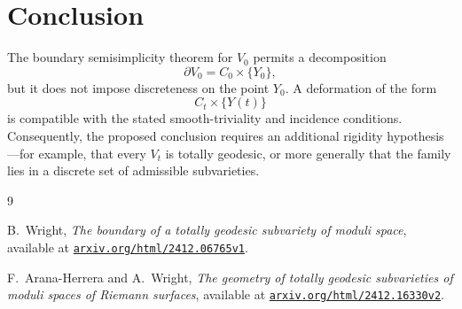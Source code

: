 \documentclass[11pt]{article}
\begin{document}
\section{Conclusion}

The boundary semisimplicity theorem for \(V_0\) permits a decomposition
\[
\partial V_0=C_0\times\{Y_0\},
\]
but it does not impose discreteness on the point \(Y_0\).  A deformation of
the form
\[
C_t\times\{Y(t)\}
\]
is compatible with the stated smooth-triviality and incidence conditions.
Consequently, the proposed conclusion requires an additional rigidity
hypothesis---for example, that every \(V_t\) is totally geodesic, or more
generally that the family lies in a discrete set of admissible subvarieties.

\begin{thebibliography}{9}

B.~Wright,
\emph{The boundary of a totally geodesic subvariety of moduli space},
available at
\href{https://arxiv.org/html/2412.06765v1}{\texttt{arxiv.org/html/2412.06765v1}}.

F.~Arana-Herrera and A.~Wright,
\emph{The geometry of totally geodesic subvarieties of moduli spaces of
Riemann surfaces},
available at
\href{https://arxiv.org/html/2412.16330v2}{\texttt{arxiv.org/html/2412.16330v2}}.

\end{thebibliography}
\end{document}
